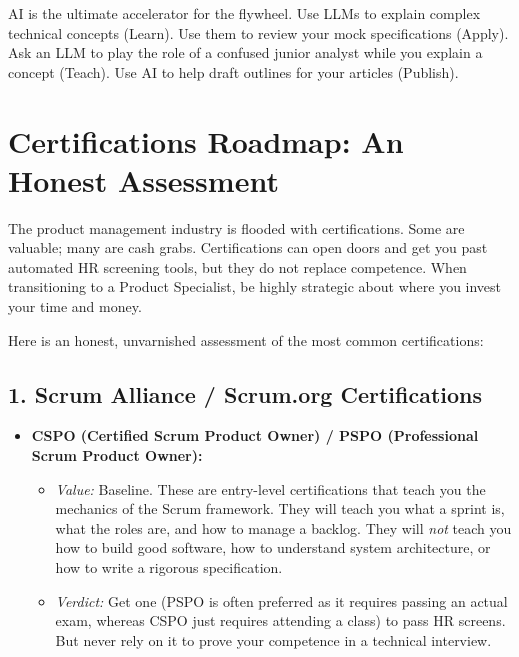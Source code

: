 AI is the ultimate accelerator for the flywheel. Use LLMs to explain
complex technical concepts (Learn). Use them to review your mock
specifications (Apply). Ask an LLM to play the role of a confused junior
analyst while you explain a concept (Teach). Use AI to help draft
outlines for your articles (Publish).

\bigskip

\section{Certifications Roadmap: An Honest
Assessment}\label{certifications-roadmap-an-honest-assessment}

The product management industry is flooded with certifications. Some are
valuable; many are cash grabs. Certifications can open doors and get you
past automated HR screening tools, but they do not replace competence.
When transitioning to a Product Specialist, be highly strategic about
where you invest your time and money.

Here is an honest, unvarnished assessment of the most common
certifications:

\subsection{1. Scrum Alliance / Scrum.org
Certifications}\label{scrum-alliance-scrum.org-certifications}

\begin{itemize}
\tightlist
\item
  \textbf{CSPO (Certified Scrum Product Owner) / PSPO (Professional
  Scrum Product Owner):}

  \begin{itemize}
  \tightlist
  \item
    \emph{Value:} Baseline. These are entry-level certifications that
    teach you the mechanics of the Scrum framework. They will teach you
    what a sprint is, what the roles are, and how to manage a backlog.
    They will \emph{not} teach you how to build good software, how to
    understand system architecture, or how to write a rigorous
    specification.
  \item
    \emph{Verdict:} Get one (PSPO is often preferred as it requires
    passing an actual exam, whereas CSPO just requires attending a
    class) to pass HR screens. But never rely on it to prove your
    competence in a technical interview.
  \end{itemize}
\end{itemize}

